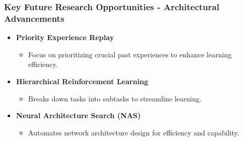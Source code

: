 \documentclass[aspectratio=169]{beamer}
\begin{document}
\begin{frame}[fragile]
    \frametitle{Key Future Research Opportunities - Architectural Advancements}
    \begin{itemize}
        \item \textbf{Priority Experience Replay}
            \begin{itemize}
                \item Focus on prioritizing crucial past experiences to enhance learning efficiency.
            \end{itemize}
        \item \textbf{Hierarchical Reinforcement Learning}
            \begin{itemize}
                \item Breaks down tasks into subtasks to streamline learning.
            \end{itemize}
        \item \textbf{Neural Architecture Search (NAS)}
            \begin{itemize}
                \item Automates network architecture design for efficiency and capability.
            \end{itemize}
    \end{itemize}
\end{frame}
\end{document}
